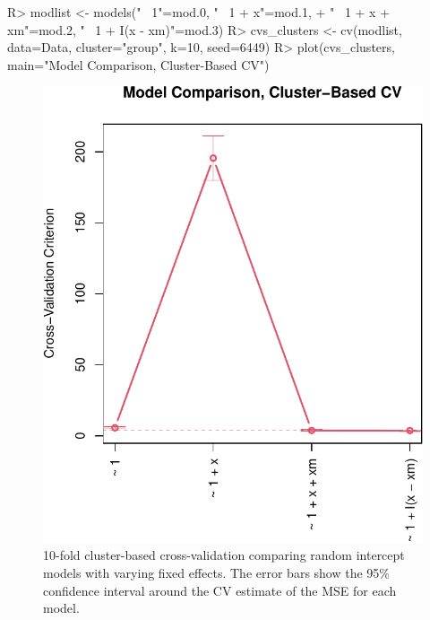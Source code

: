 \documentclass[
]{jss}
\begin{document}
\begin{CodeChunk}
\begin{CodeInput}
R> modlist <- models("~ 1"=mod.0, "~ 1 + x"=mod.1, 
+                   "~ 1 + x + xm"=mod.2, "~ 1 + I(x - xm)"=mod.3)
R> cvs_clusters <- cv(modlist, data=Data, cluster="group", k=10, seed=6449)
R> plot(cvs_clusters, main="Model Comparison, Cluster-Based CV")
\end{CodeInput}
\begin{figure}

{\centering \includegraphics[width=1\linewidth]{JSS-article-reduced_files/figure-latex/cross-validation-clusters-1} 

}

\caption[10-fold cluster-based cross-validation comparing random intercept models with varying fixed effects]{10-fold cluster-based cross-validation comparing random intercept models with varying fixed effects. The error bars show the 95\% confidence interval around the CV estimate of the MSE for each model.}\label{fig:cross-validation-clusters}
\end{figure}
\end{CodeChunk}
\end{document}
